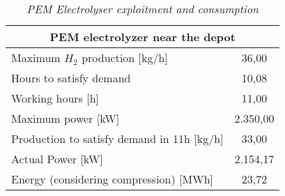 \begin{table}[ht]
\centering
\begin{tabular}{|c|c|}
\hline
\multicolumn{2}{|c|}{\cellcolor{bluepoli!40}\textbf{PEM electrolyzer near the depot}}   \\ \hline
\multicolumn{1}{|l|}{Maximum $H_2$ production {[}kg/h{]}}       & 36,00    \\ \hline
\multicolumn{1}{|l|}{Hours to satisfy demand}                   & 10,08    \\ \hline
\multicolumn{1}{|l|}{Working hours {[}h{]}}                     & 11,00    \\ \hline
\multicolumn{1}{|l|}{Maximum power {[}kW{]}}                    & 2.350,00 \\ \hline
\multicolumn{1}{|l|}{Production to satisfy demand in 11h {[}kg/h{]}} & 33,00    \\ \hline
\multicolumn{1}{|l|}{Actual Power {[}kW{]}}                     & 2.154,17 \\ \hline
\multicolumn{1}{|l|}{Energy (considering compression) {[}MWh{]}} & 23,72    \\ \hline
\end{tabular}
\caption{\textit{PEM Electrolyser exploitment and consumption}}
\label{tab:crodotech}
\end{table}